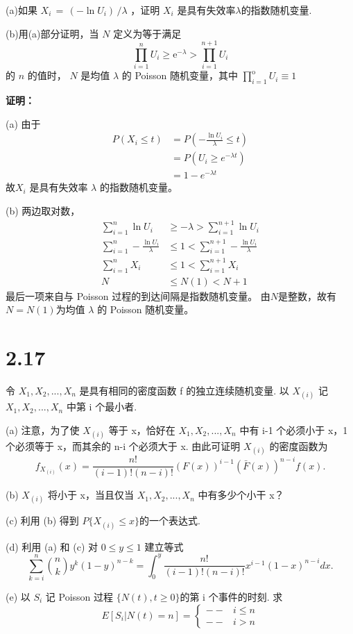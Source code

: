\documentclass[12pt]{article}
\begin{document}
(a)如果 $X_{i} \,=\, (-\operatorname{l n} \! U_{i} ) \, / \lambda$ ，证明 $X_{i}$ 是具有失效率\(\lambda\)的指数随机变量. 

(b)用(a)部分证明，当 $N$ 定义为等于满足
$$
\prod_{i=1}^{n} U_{i} \geqslant\mathrm{e}^{-\lambda} > \prod_{i=1}^{n+1} U_{i} 
$$
的 $n$ 的值时， $N$ 是均值 $\lambda$ 的 Poisson 随机变量，其中 $\prod_{i=1}^{\mathrm{o}} U_{i} \equiv1$ 

\textbf{证明：}

(a) 由于$$\begin{aligned}
P(X_{i}\leq t) & =P(-\frac{\ln U_{i}}{\lambda}\leq t) \\
 & =P(U_{i}\geq e^{-\lambda t}) \\
 & =1-e^{-\lambda t}
\end{aligned}$$
故$X_i$ 是具有失效率 $\lambda$ 的指数随机变量。

(b) 两边取对数，
$$\begin{aligned}
    \sum_{i=1}^{n}\ln U_{i}&\geq-\lambda>\sum_{i=1}^{n+1}\ln U_{i}\\
    \sum_{i=1}^{n}-\frac{\ln U_{i}}{\lambda}&\le1< \sum_{i=1}^{n+1}-\frac{\ln U_{i}}{\lambda}\\
    \sum_{i=1}^{n}X_i&\le1< \sum_{i=1}^{n+1}X_i\\
    N&\le N(1)<N+1
\end{aligned}$$
最后一项来自与 Poisson 过程的到达间隔是指数随机变量。
由\(N\)是整数，故有\(N=N(1)\)为均值 $\lambda$ 的 Poisson 随机变量。

\section*{2.17}
令 $X_1,X_2,...,X_n$ 是具有相同的密度函数 f 的独立连续随机变量. 以 $X_{(i)}$ 记 $X_1,X_2,...,X_n$ 中第 i 个最小者.

(a) 注意，为了使 $X_{(i)}$ 等于 x，恰好在 $X_1,X_2,...,X_n$ 中有 i-1 个必须小于 x，1 个必须等于 x，而其余的 n-i 个必须大于 x. 由此可证明 $X_{(i)}$ 的密度函数为
$$f_{X_{(i)}}(x)=\frac{n!}{(i-1)!(n-i)!}(F(x))^{i-1}(\bar{F}(x))^{n-i}f(x).$$

(b) $X_{(i)}$ 将小于 x，当且仅当 $X_1,X_2,...,X_n$ 中有多少个小干 x？

(c) 利用 (b) 得到 $P\{X_{(i)}\le x\}$的一个表达式.

(d) 利用 (a) 和 (c) 对 \(0 \le y \le 1\) 建立等式
$$\sum_{k=i}^n\binom{n}{k}y^k(1-y)^{n-k}=\int_0^y\frac{n!}{(i-1)!(n-i)!}x^{i-1}(1-x)^{n-i}dx.$$

(e) 以 $S_i$ 记 Poisson 过程 $\{N(t),t\ge0\}$的第 i 个事件的时刻. 求
$$E[S_i|N(t)=n]=\left\{\begin{matrix}
--&i\le n\\
--&i>n
\end{matrix}\right.$$
\end{document}
